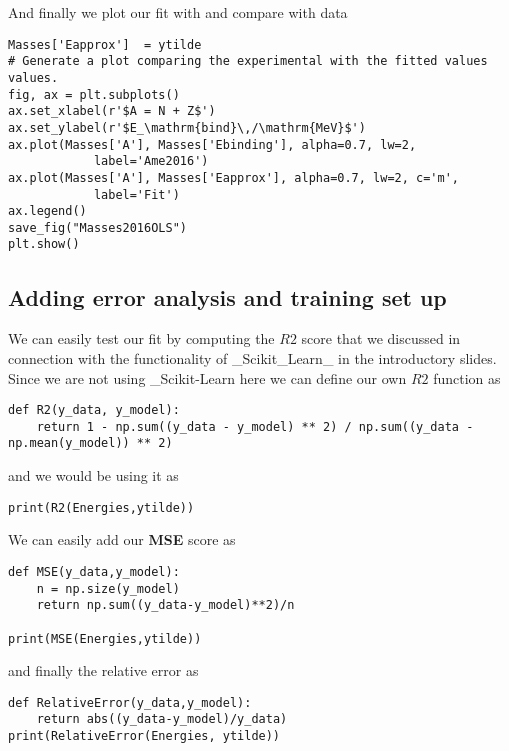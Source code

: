 \documentclass[%
oneside,                 %
final,                   %
10pt]{article}
\begin{document}
And finally we plot our fit with and compare with data
\begin{verbatim}
Masses['Eapprox']  = ytilde
# Generate a plot comparing the experimental with the fitted values values.
fig, ax = plt.subplots()
ax.set_xlabel(r'$A = N + Z$')
ax.set_ylabel(r'$E_\mathrm{bind}\,/\mathrm{MeV}$')
ax.plot(Masses['A'], Masses['Ebinding'], alpha=0.7, lw=2,
            label='Ame2016')
ax.plot(Masses['A'], Masses['Eapprox'], alpha=0.7, lw=2, c='m',
            label='Fit')
ax.legend()
save_fig("Masses2016OLS")
plt.show()
\end{verbatim}

\subsection*{Adding error analysis and training set up}

We can easily test our fit by computing the $R2$ score that we discussed in connection with the functionality of _Scikit_Learn_ in the introductory slides.
Since we are not using _Scikit-Learn here we can define our own $R2$ function as
\begin{verbatim}
def R2(y_data, y_model):
    return 1 - np.sum((y_data - y_model) ** 2) / np.sum((y_data - np.mean(y_model)) ** 2)
\end{verbatim}
and we would be using it as 
\begin{verbatim}
print(R2(Energies,ytilde))
\end{verbatim}

We can easily add our \textbf{MSE} score as
\begin{verbatim}
def MSE(y_data,y_model):
    n = np.size(y_model)
    return np.sum((y_data-y_model)**2)/n

print(MSE(Energies,ytilde))
\end{verbatim}
and finally the relative error as
\begin{verbatim}
def RelativeError(y_data,y_model):
    return abs((y_data-y_model)/y_data)
print(RelativeError(Energies, ytilde))
\end{verbatim}
\end{document}
